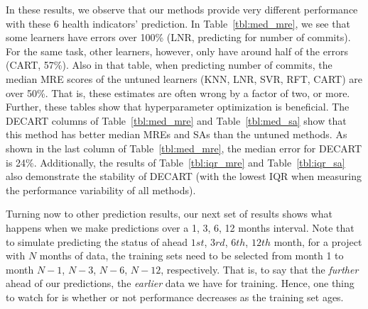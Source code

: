 \documentclass[smallextended]{svjour3}
\begin{document}
In these results, we observe that our methods provide very different performance with these 6 health indicators' prediction. In Table~\ref{tbl:med_mre}, we see that some learners have errors over 100\% (LNR, predicting for number of commits). For the same task, other learners, however, only have around half of the errors (CART, 57\%).
Also in that table, when predicting number of commits, the median MRE scores of the untuned learners (KNN, LNR, SVR, RFT, CART) are over 50\%. That is,  these estimates are often wrong by a factor of two, or more.
Further, these tables show that   hyperparameter optimization is   beneficial.
The  DECART columns of Table~\ref{tbl:med_mre} and Table~\ref{tbl:med_sa} show that this method has better median MREs and SAs than the untuned methods. As shown in the last column of Table~\ref{tbl:med_mre}, the median error for DECART is 24\%. Additionally, the results of Table~\ref{tbl:iqr_mre} and Table~\ref{tbl:iqr_sa} also demonstrate the stability of DECART (with the lowest IQR when measuring the performance variability of all methods).

 
 




 
Turning now to other prediction results, our next set of results shows what happens when we make predictions over a 1, 3, 6, 12 months interval.
Note that to simulate predicting the status of ahead $1st$, $3rd$, $6th$, $12th$ month, for a project with $N$ months of data, the training sets need to be selected from month 1 to month $N-1$, $N-3$, $N-6$, $N-12$, respectively. That is, to say that the {\em further} ahead of our predictions, the {\em earlier} data we have for training. Hence, one thing to watch for is whether or not performance decreases as the training set ages.

  
\end{document}

